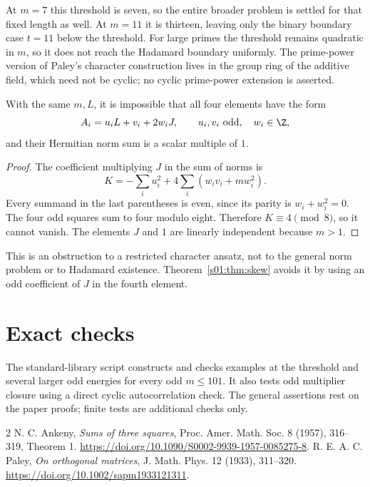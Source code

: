 At $m=7$ this threshold is seven, so the entire broader problem is
settled for that fixed length as well. At $m=11$ it is thirteen, leaving
only the binary boundary case $t=11$ below the threshold. For large
primes the threshold remains quadratic in $m$, so it does not reach
the Hadamard boundary uniformly. The prime-power version of Paley's
character construction lives in the group ring of the additive field,
which need not be cyclic; no cyclic prime-power extension is asserted.

\begin{proposition}
With the same $m,L$, it is impossible that all four elements have the
form
\[
 A_i=u_iL+v_i+2w_iJ,\qquad u_i,v_i\text{ odd},\quad w_i\in\Z,
\]
and their Hermitian norm sum is a scalar multiple of $1$.
\end{proposition}
\begin{proof}
The coefficient multiplying $J$ in the sum of norms is
\[
 K=-\sum_i u_i^2+4\sum_i(w_iv_i+mw_i^2).
\]
Every summand in the last parentheses is even, since its parity is
$w_i+w_i^2=0$. The four odd squares sum to four modulo eight.
Therefore $K\equiv4\pmod8$, so it cannot vanish. The elements $J$ and
$1$ are linearly independent because $m>1$.
\end{proof}
This is an obstruction to a restricted character ansatz, not to the
general norm problem or to Hadamard existence. Theorem~\ref{s01:thm:skew}
avoids it by using an odd coefficient of $J$ in the fourth element.

\section*{Exact checks}
The standard-library script  constructs and
checks examples at the threshold and several larger odd energies for
every odd $m\le101$. It also tests odd multiplier closure using a direct
cyclic autocorrelation check. The general assertions rest on the paper
proofs; finite tests are additional checks only.

\begin{thebibliography}{2}
 N. C. Ankeny, \emph{Sums of three squares},
Proc. Amer. Math. Soc. 8 (1957), 316--319, Theorem 1.
\url{https://doi.org/10.1090/S0002-9939-1957-0085275-8}.
 R. E. A. C. Paley, \emph{On orthogonal matrices},
J. Math. Phys. 12 (1933), 311--320.
\url{https://doi.org/10.1002/sapm1933121311}.
\end{thebibliography}

